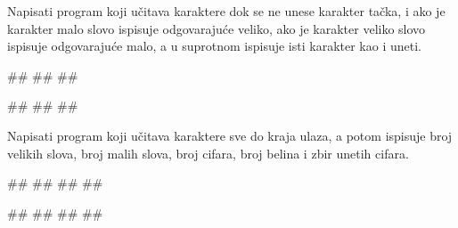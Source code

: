 \begin{Exercise}[label=1.3_34] 
Napisati program koji učitava karaktere dok se ne unese karakter tačka,
i ako je karakter malo slovo ispisuje odgovarajuće veliko, ako je
karakter veliko slovo ispisuje odgovarajuće malo, a u suprotnom
ispisuje isti karakter kao i uneti.

\begin{miditest}
\begin{upotreba}{1}
#\naslovInt#
##
##
\end{upotreba}
\end{miditest}
\begin{miditest}
\begin{upotreba}{2}
#\naslovInt#
##
##
\end{upotreba}
\end{miditest}
\end{Exercise}
\begin{Answer}[ref=1.3_34]
\end{Answer}

\begin{Exercise}[label=1.3_35] 
Napisati program koji učitava karaktere sve do kraja ulaza, a potom
ispisuje broj velikih slova, broj malih slova, broj cifara, broj
belina i zbir unetih cifara.

\begin{miditest}
\begin{upotreba}{1}
#\naslovInt#
##
##
##
\end{upotreba}
\end{miditest}
\begin{miditest}
\begin{upotreba}{2}
#\naslovInt#
##
##
##
\end{upotreba}
\end{miditest}
\end{Exercise}
\begin{Answer}[ref=1.3_35]
\end{Answer}


